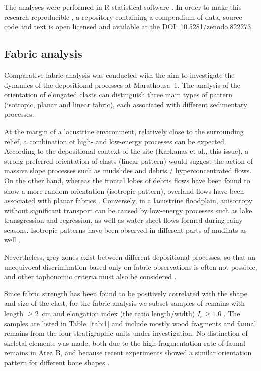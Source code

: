 \documentclass[review,authoryear,times]{elsarticle} %
\begin{document}
The analyses were performed in \textsf{R} statistical software \citep{RCoreTeam2016}. In order to make this research reproducible \citep{Marwick2017}, a repository containing a compendium of data, source code and text is open licensed and available at the DOI: \href{https://doi.org/10.5281/zenodo.822273}{10.5281/zenodo.822273}

\subsection{Fabric analysis}

Comparative fabric analysis was conducted with the aim to investigate the dynamics of the depositional processes at Marathousa~1. The analysis of the orientation of elongated clasts can distinguish three main types of pattern (isotropic, planar and linear fabric), each associated with different sedimentary processes.

At the margin of a lacustrine environment, relatively close to the surrounding relief, a combination of high- and low-energy processes can be expected. According to the depositional context of the site (Karkanas et al., this issue), a strong preferred orientation of clasts (linear pattern) would suggest the action of massive slope processes such as mudslides and debris / hyperconcentrated flows. On the other hand, whereas the frontal lobes of debris flows have been found to show a more random orientation (isotropic pattern), overland flows have been associated with planar fabrics \citep{Lenoble2004}. Conversely, in a lacustrine floodplain, anisotropy without significant transport can be caused by low-energy processes such as lake transgression and regression, as well as water-sheet flows formed during rainy seasons. Isotropic patterns have been observed in different parts of mudflats as well \citep{Cobo-Sanchez2014}.

Nevertheless, grey zones exist between different depositional processes, so that an unequivocal discrimination based only on fabric observations is often not possible, and other taphonomic criteria must also be considered \citep{}.

Since fabric strength has been found to be positively correlated with the shape and size of the clast, for the fabric analysis we subset samples of remains with length $\geq2$~cm and elongation index (the ratio length/width) $I_{e}\geq1.6$ \citep{Lenoble2004}. The samples are listed in Table~\ref{tab:1} and include mostly wood fragments %
and faunal remains from the four stratigraphic units under investigation. No distinction of skeletal elements was made, both due to the high fragmentation rate of faunal remains in Area B, and because recent experiments showed a similar orientation pattern for different bone shapes \citep{Dominguez-Rodrigo2013,Dominguez-Rodrigo2012}.
\end{document}
